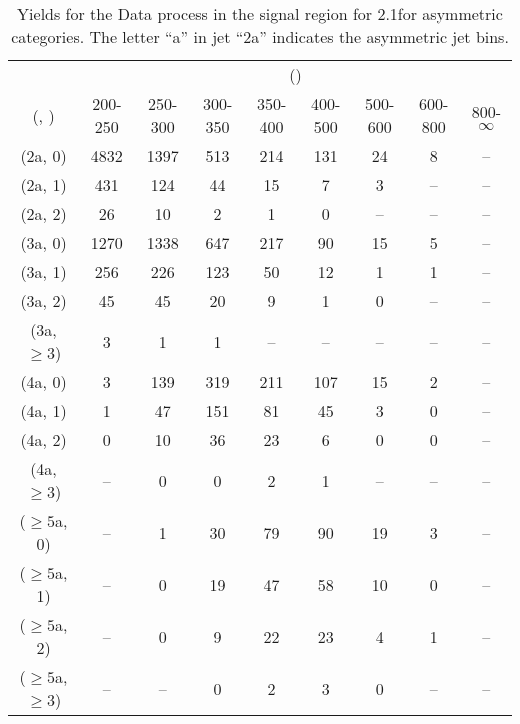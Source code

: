 \begin{table}[h!]
\tiny
\centering
\caption{Yields for the Data process in the signal region for 2.1\ifb for asymmetric categories. The letter ``a'' in jet \eg ``2a''  indicates the asymmetric jet bins.\label{tab:yieldssep_sig_data_asym}}
\begin{tabular}
{ccccccccc}
	\hline\hline
	& \multicolumn{8}{c}{\scalht (\gev)} \\ 
	 (\njet,  \nb) & 200-250 & 250-300 & 300-350 & 350-400 & 400-500 & 500-600 & 600-800 & 800-$\infty$ \\ [0.8ex] 
\hline
	(2a, 0) & 4832 & 1397 & 513 & 214 & 131 & 24 & 8 & -- \\[0.5ex] 
	(2a, 1) & 431 & 124 & 44 & 15 & 7 & 3 & -- & -- \\[0.5ex] 
	(2a, 2) & 26 & 10 & 2 & 1 & 0 & -- & -- & -- \\[0.5ex] 
	(3a, 0) & 1270 & 1338 & 647 & 217 & 90 & 15 & 5 & -- \\[0.5ex] 
	(3a, 1) & 256 & 226 & 123 & 50 & 12 & 1 & 1 & -- \\[0.5ex] 
	(3a, 2) & 45 & 45 & 20 & 9 & 1 & 0 & -- & -- \\[0.5ex] 
	(3a, $\ge3$) & 3 & 1 & 1 & -- & -- & -- & -- & -- \\[0.5ex] 
	(4a, 0) & 3 & 139 & 319 & 211 & 107 & 15 & 2 & -- \\[0.5ex] 
	(4a, 1) & 1 & 47 & 151 & 81 & 45 & 3 & 0 & -- \\[0.5ex] 
	(4a, 2) & 0 & 10 & 36 & 23 & 6 & 0 & 0 & -- \\[0.5ex] 
	(4a, $\ge3$) & -- & 0 & 0 & 2 & 1 & -- & -- & -- \\[0.5ex] 
	($\ge5$a, 0) & -- & 1 & 30 & 79 & 90 & 19 & 3 & -- \\[0.5ex] 
	($\ge5$a, 1) & -- & 0 & 19 & 47 & 58 & 10 & 0 & -- \\[0.5ex] 
	($\ge5$a, 2) & -- & 0 & 9 & 22 & 23 & 4 & 1 & -- \\[0.5ex] 
	($\ge5$a, $\ge3$) & -- & -- & 0 & 2 & 3 & 0 & -- & -- \\[0.5ex] 
	\hline
	\hline
\end{tabular}
\end{table}
